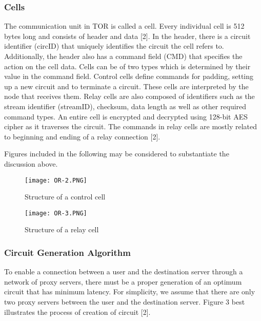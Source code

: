 \documentclass{article}
\begin{document}
\subsubsection{Cells}
The communication unit in TOR is called a cell. Every individual cell is 512 bytes long and consists of header and data [2]. In the header, there is a circuit identifier (circID) that uniquely identifies the circuit the cell refers to. Additionally, the header also has a command field (CMD) that specifies the action on the cell data. Cells can be of two types which is determined by their value in the command field. Control cells define commands for padding, setting up a new circuit and to terminate a circuit. These cells are interpreted by the node that receives them. Relay cells are also composed of identifiers such as the stream identifier (streamID), checksum, data length as well as other required command types. An entire cell is encrypted and decrypted using 128-bit AES cipher as it traverses the circuit. The commands in relay cells are mostly related to beginning and ending of a relay connection [2].
 \\

\vspace{0.3 cm}

\noindent Figures included in the following may be considered to substantiate the discussion above. \\

\begin{figure}[!ht]
	\label{fig:iv}
    \centering
    \texttt{[image: OR-2.PNG]}
    \caption{Structure of a control cell}
\end{figure}
\begin{figure}[!ht]
	\label{fig:iv}
    \centering
    \texttt{[image: OR-3.PNG]}
    \caption{Structure of a relay cell}
\end{figure}

\subsubsection{Circuit Generation Algorithm}

To enable a connection between a user and the destination server through a network of proxy servers, there must be a proper generation of an optimum circuit that has minimum latency. For simplicity, we assume that there are only two proxy servers between the user and the destination server. Figure 3 best illustrates the process of creation of circuit [2]. \\
\end{document}
